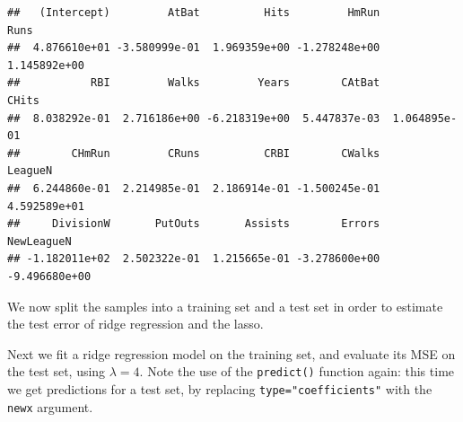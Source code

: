 \documentclass[openany]{book}
\newenvironment{Shaded}{\begin{snugshade}}{\end{snugshade}}
\newcommand{\DecValTok}[1]{\textcolor[rgb]{0.00,0.00,0.81}{#1}}
\newcommand{\FloatTok}[1]{\textcolor[rgb]{0.00,0.00,0.81}{#1}}
\newcommand{\KeywordTok}[1]{\textcolor[rgb]{0.13,0.29,0.53}{\textbf{#1}}}
\newcommand{\NormalTok}[1]{#1}
\newcommand{\OperatorTok}[1]{\textcolor[rgb]{0.81,0.36,0.00}{\textbf{#1}}}
\newcommand{\StringTok}[1]{\textcolor[rgb]{0.31,0.60,0.02}{#1}}
\begin{document}
\begin{verbatim}
##   (Intercept)         AtBat          Hits         HmRun          Runs 
##  4.876610e+01 -3.580999e-01  1.969359e+00 -1.278248e+00  1.145892e+00 
##           RBI         Walks         Years        CAtBat         CHits 
##  8.038292e-01  2.716186e+00 -6.218319e+00  5.447837e-03  1.064895e-01 
##        CHmRun         CRuns          CRBI        CWalks       LeagueN 
##  6.244860e-01  2.214985e-01  2.186914e-01 -1.500245e-01  4.592589e+01 
##     DivisionW       PutOuts       Assists        Errors    NewLeagueN 
## -1.182011e+02  2.502322e-01  1.215665e-01 -3.278600e+00 -9.496680e+00
\end{verbatim}

We now split the samples into a training set and a test set in order
to estimate the test error of ridge regression and the lasso.

\begin{Shaded}
\end{Shaded}

Next we fit a ridge regression model on the training set, and evaluate
its MSE on the test set, using \(\lambda = 4\). Note the use of the \texttt{predict()}
function again: this time we get predictions for a test set, by replacing
\texttt{type="coefficients"} with the \texttt{newx} argument.
\end{document}
